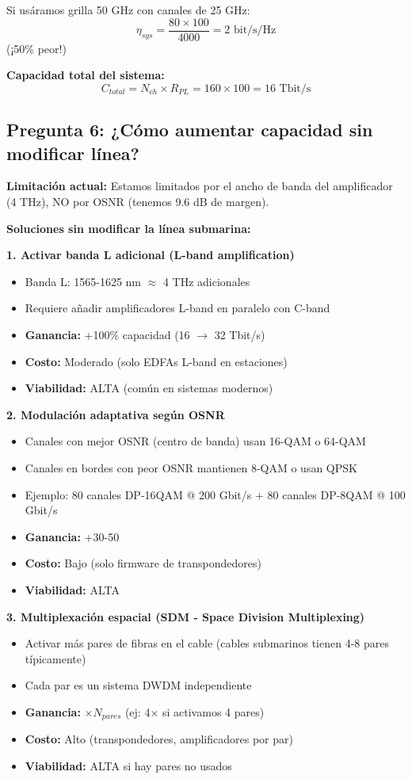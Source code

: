 \documentclass[a4paper,10pt]{article}
\begin{document}
Si usáramos grilla 50 GHz con canales de 25 GHz:
$$\eta_{sys} = \frac{80 \times 100}{4000} = 2 \text{ bit/s/Hz}$$ (¡50\% peor!)

\textbf{Capacidad total del sistema:}
$$C_{total} = N_{ch} \times R_{PL} = 160 \times 100 = \boxed{16 \text{ Tbit/s}}$$

\subsection{Pregunta 6: ¿Cómo aumentar capacidad sin modificar línea?}

\textbf{Limitación actual:} Estamos limitados por el ancho de banda del amplificador (4 THz), NO por OSNR (tenemos 9.6 dB de margen).

\textbf{Soluciones sin modificar la línea submarina:}

\textbf{1. Activar banda L adicional (L-band amplification)}
\begin{itemize}
    \item Banda L: 1565-1625 nm $\approx$ 4 THz adicionales
    \item Requiere añadir amplificadores L-band en paralelo con C-band
    \item \textbf{Ganancia:} +100\% capacidad (16 $\rightarrow$ 32 Tbit/s)
    \item \textbf{Costo:} Moderado (solo EDFAs L-band en estaciones)
    \item \textbf{Viabilidad:} ALTA (común en sistemas modernos)
\end{itemize}

\textbf{2. Modulación adaptativa según OSNR}
\begin{itemize}
    \item Canales con mejor OSNR (centro de banda) usan 16-QAM o 64-QAM
    \item Canales en bordes con peor OSNR mantienen 8-QAM o usan QPSK
    \item Ejemplo: 80 canales DP-16QAM @ 200 Gbit/s + 80 canales DP-8QAM @ 100 Gbit/s
    \item \textbf{Ganancia:} +30-50%
    \item \textbf{Costo:} Bajo (solo firmware de transpondedores)
    \item \textbf{Viabilidad:} ALTA
\end{itemize}

\textbf{3. Multiplexación espacial (SDM - Space Division Multiplexing)}
\begin{itemize}
    \item Activar más pares de fibras en el cable (cables submarinos tienen 4-8 pares típicamente)
    \item Cada par es un sistema DWDM independiente
    \item \textbf{Ganancia:} $\times N_{pares}$ (ej: 4× si activamos 4 pares)
    \item \textbf{Costo:} Alto (transpondedores, amplificadores por par)
    \item \textbf{Viabilidad:} ALTA si hay pares no usados
\end{itemize}
\end{document}
